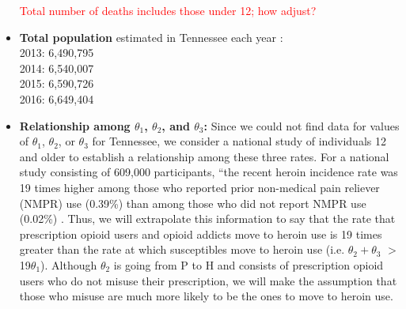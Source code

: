 \documentclass[12pt]{article}
\begin{document}
\begin{itemize}
\textcolor{red}{Total number of deaths includes those under 12; how adjust?} 

\item \textbf{Total population} estimated in Tennessee each year \cite{USCensus}: \\
2013: 6,490,795 \\
2014: 6,540,007 \\
2015: 6,590,726 \\
2016: 6,649,404 \\

\item \textbf{Relationship among $\theta_1$, $\theta_2$, and $\theta_3$:} Since we could not find data for values of $\theta_1$, $\theta_2$, or $\theta_3$ for Tennessee, we consider a national study of individuals 12 and older to establish a relationship among these three rates. For a national study consisting of 609,000 participants, ``the recent heroin incidence rate was 19 times higher among those who reported prior non-medical pain reliever (NMPR) use (0.39\%) than among those who did not report NMPR use (0.02\%) \cite{Muhuri}.
Thus, we will extrapolate this information to say that the rate that prescription opioid users and opioid addicts move to heroin use is 19 times greater than the rate at which susceptibles move to heroin use (i.e. $\theta_2 + \theta_3$ $>$ 19$\theta_1$). Although $\theta_2$ is going from P to H and consists of prescription opioid users who do not misuse their prescription, we will make the assumption that those who misuse are much more likely to be the ones to move to heroin use.


\end{itemize}

\pagebreak



 
\end{document}
